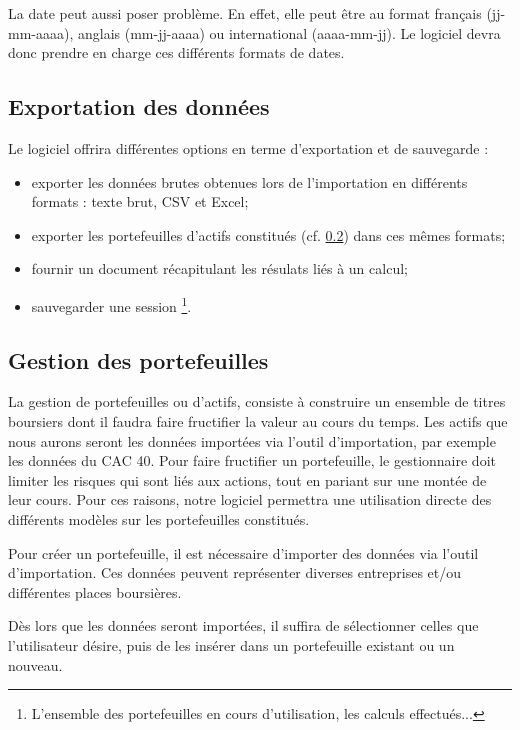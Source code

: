 		La date peut aussi poser problème. En effet, elle peut être au format français (jj-mm-aaaa), anglais (mm-jj-aaaa) ou international (aaaa-mm-jj). Le logiciel devra donc prendre en charge ces différents formats de dates.


	\subsection{Exportation des données}
		Le logiciel offrira différentes options en terme d’exportation et de sauvegarde :
		\begin{itemize}
			\item exporter les données brutes obtenues lors de l’importation en différents formats : texte brut, CSV et Excel;
			\item exporter les portefeuilles d’actifs constitués (cf. \ref{subsubsection:portefeuilles}) dans ces mêmes formats;
			\item fournir un document récapitulant les résulats liés à un calcul;
			\item sauvegarder une session \footnote{L’ensemble des portefeuilles en cours d’utilisation, les calculs effectués...}.
		\end{itemize}


	\subsection{Gestion des portefeuilles}
	\label{subsubsection:portefeuilles}

		La gestion de portefeuilles ou d’actifs, consiste à construire un ensemble de titres boursiers dont il faudra faire fructifier la valeur au cours du temps. Les actifs que nous aurons seront les données importées via l’outil d’importation, par exemple les données du CAC 40.
		Pour faire fructifier un portefeuille, le gestionnaire doit limiter les risques qui sont liés aux actions, tout en pariant sur une montée de leur cours. Pour ces raisons, notre logiciel permettra une utilisation directe des différents modèles sur les portefeuilles constitués.


		Pour créer un portefeuille, il est nécessaire d’importer des données via l’outil d’importation. Ces données peuvent représenter diverses entreprises et/ou différentes places boursières. 

		Dès lors que les données seront importées, il suffira de sélectionner celles que l’utilisateur désire, puis de les insérer dans un portefeuille existant ou un nouveau.

